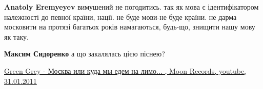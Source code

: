 \begin{itemize}
\begin{itemize}
\begin{itemize}
 
\textbf{Anatoly Eremyeyev} вимушений не погодитись. так як мова є
ідентифікатором належності до певної країни, нації. не буде мови-не буде
країни. не дарма московити на протязі багатьох років намагаються,
будь-що, знищити нашу мову як таку.

\end{itemize}

 
\textbf{Максим Сидоренко} а що закалялась цією піснею?

\href{https://www.youtube.com/watch?v=UsUqEaA0L1o}{%
Green Grey - Москва или куда мы едем на лимо... ,%
Moon Records, youtube, 31.01.2011%
}

\end{itemize}

\end{itemize}

